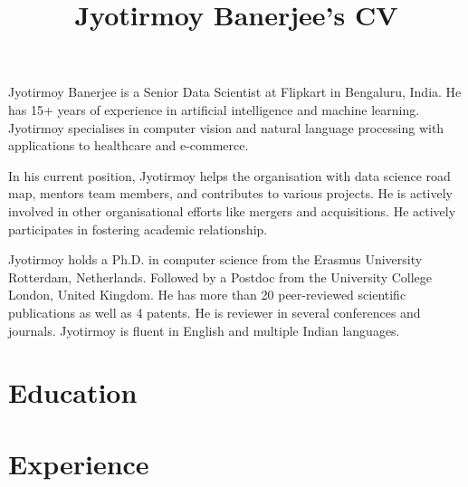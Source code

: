 \documentclass[a4paper,online]{adcv}
\title{Jyotirmoy Banerjee’s CV}
\begin{document}
Jyotirmoy Banerjee is a Senior Data Scientist at Flipkart in Bengaluru, India. He has 15+ years of experience in artificial intelligence and machine learning.
Jyotirmoy specialises in computer vision and natural language processing with applications to healthcare and e-commerce.

In his current position, Jyotirmoy helps the organisation with data science road map, mentors team members, and contributes to various projects. 
He is actively involved in other organisational efforts like mergers and acquisitions. He actively participates in fostering academic relationship.

Jyotirmoy holds a Ph.D. in computer science from the Erasmus University Rotterdam, Netherlands. Followed by a Postdoc from the University College London, United Kingdom. He has more than 20 peer-reviewed scientific publications as well as 4 patents. He is reviewer in several conferences and journals.
Jyotirmoy is fluent in English and multiple Indian languages.

\section{Education}

\begin{adcvtabletwo}
\end{adcvtabletwo}


\section{Experience}
\end{document}
